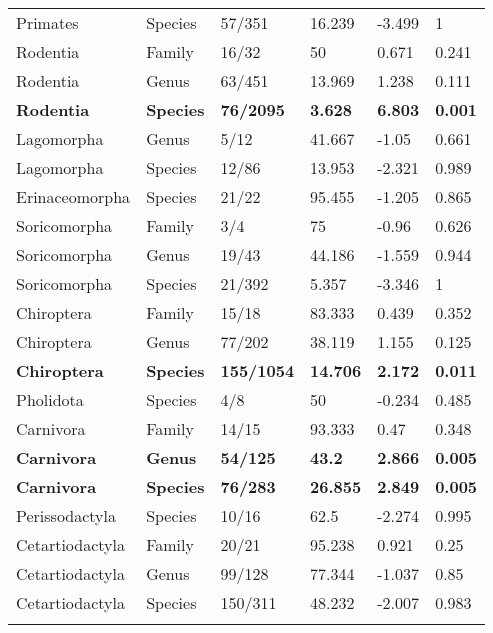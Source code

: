 \begin{longtable}{llllll}
  Primates & Species & 57/351 & 16.239 & -3.499 & 1 \\ 
  Rodentia & Family & 16/32 & 50 & 0.671 & 0.241 \\ 
  Rodentia & Genus & 63/451 & 13.969 & 1.238 & 0.111 \\ 
  \textbf{Rodentia} & \textbf{Species} & \textbf{76/2095} & \textbf{3.628} & \textbf{6.803} & \textbf{0.001} \\ 
  Lagomorpha & Genus & 5/12 & 41.667 & -1.05 & 0.661 \\ 
  Lagomorpha & Species & 12/86 & 13.953 & -2.321 & 0.989 \\ 
  Erinaceomorpha & Species & 21/22 & 95.455 & -1.205 & 0.865 \\ 
  Soricomorpha & Family & 3/4 & 75 & -0.96 & 0.626 \\ 
  Soricomorpha & Genus & 19/43 & 44.186 & -1.559 & 0.944 \\ 
  Soricomorpha & Species & 21/392 & 5.357 & -3.346 & 1 \\ 
  Chiroptera & Family & 15/18 & 83.333 & 0.439 & 0.352 \\ 
  Chiroptera & Genus & 77/202 & 38.119 & 1.155 & 0.125 \\ 
  \textbf{Chiroptera} & \textbf{Species} & \textbf{155/1054} & \textbf{14.706} & \textbf{2.172} & \textbf{0.011} \\ 
  Pholidota & Species & 4/8 & 50 & -0.234 & 0.485 \\ 
  Carnivora & Family & 14/15 & 93.333 & 0.47 & 0.348 \\ 
  \textbf{Carnivora} & \textbf{Genus} & \textbf{54/125} & \textbf{43.2} & \textbf{2.866} & \textbf{0.005} \\ 
  \textbf{Carnivora} & \textbf{Species} & \textbf{76/283} & \textbf{26.855} & \textbf{2.849} & \textbf{0.005} \\ 
  Perissodactyla & Species & 10/16 & 62.5 & -2.274 & 0.995 \\ 
  Cetartiodactyla & Family & 20/21 & 95.238 & 0.921 & 0.25 \\ 
  Cetartiodactyla & Genus & 99/128 & 77.344 & -1.037 & 0.85 \\ 
  Cetartiodactyla & Species & 150/311 & 48.232 & -2.007 & 0.983 \\ 
   \hline
\hline
\label{Supp_data_structurePD_threshold1}
\end{longtable}
